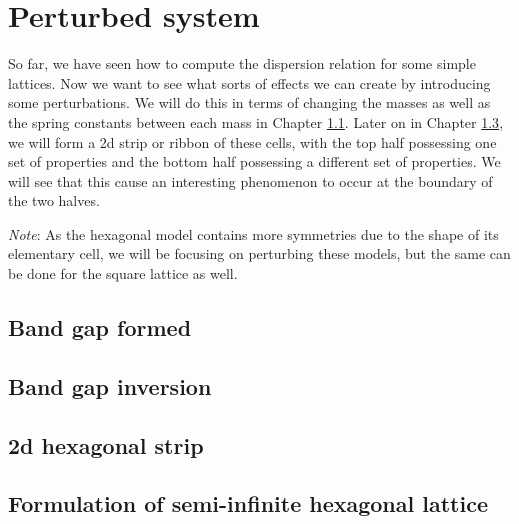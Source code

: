 \chapter{Perturbed system}
\label{perturbed}

So far, we have seen how to compute the dispersion relation for some simple
lattices. Now we want to see what sorts of effects we can create by introducing
some perturbations. We will do this in terms of changing the masses as well as
the spring constants between each mass in Chapter \ref{formbandgap}. Later on
in Chapter \ref{formstrip}, we will form a 2d strip or ribbon of these cells,
with the top half possessing one set of properties and the bottom half
possessing a different set of properties. We will see that this cause an
interesting phenomenon to occur at the boundary of the two halves.

\textit{Note}: As the hexagonal model contains more symmetries due to the shape
of its elementary cell, we will be focusing on perturbing these models, but the
same can be done for the square lattice as well. 

\section{Band gap formed}
\label{formbandgap}


\section{Band gap inversion}

\section{2d hexagonal strip}
\label{formstrip}

\section{Formulation of semi-infinite hexagonal lattice}
